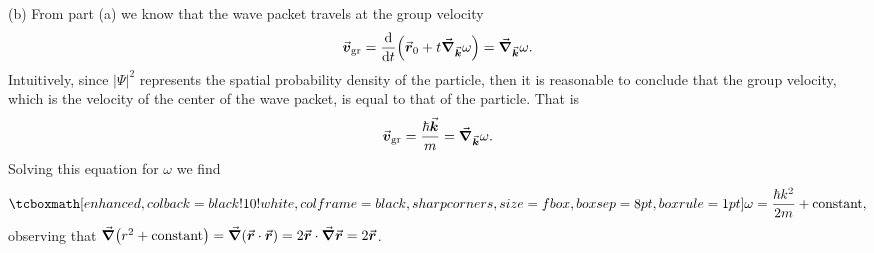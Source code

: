 {(b) From part (a) we know that the wave packet travels at the group velocity
\begin{eqnarray}
    \va*{v}_{\rm gr} = \dv{t} ( \va*{r}_{0} + t \grad_{\va*{k}} \omega ) = \grad_{\va*{k}} \omega
.\end{eqnarray}
Intuitively, since $|\Psi|^2$ represents the spatial probability density of the particle, then it is reasonable to conclude that the group velocity, which is the velocity of the center of the wave packet, is equal to that of the particle.
That is
\begin{eqnarray}
   \va*{v}_{\rm gr} = \frac{\hbar \va*{k}}{m} = \grad_{\va*{k}} \omega
.\end{eqnarray}
Solving this equation for $\omega$ we find
\begin{eqnarray}
    \eqbox{ \omega = \frac{\hbar k^2}{2m} + {\rm constant} }
,\end{eqnarray}
observing that $\grad (r^2 + {\rm constant}) = \grad ( \va*{r} \cdot \va*{r} ) =  2 \va*{r} \cdot \grad \va*{r} = 2 \va*{r}$.

}




